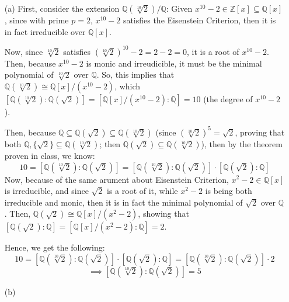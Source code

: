 \documentclass{article}
\begin{document}
\begin{itemize}
    \item[(a)] First, consider the extension $\mathbb{Q}(\sqrt[10]{2})/\mathbb{Q}$: Given $x^{10}-2\in\mathbb{Z}[x]\subseteq\mathbb{Q}[x]$, since with prime $p=2$, $x^{10}-2$ satisfies the Eisenstein Criterion,
    then it is in fact irreducible over $\mathbb{Q}[x]$.

    Now, since $\sqrt[10]{2}$ satisfies $(\sqrt[10]{2})^{10}-2=2-2=0$, it is a root of $x^{10}-2$.
    Then, because $x^{10}-2$ is monic and irreudicible, it must be the minimal polynomial of $\sqrt[10]{2}$ over $\mathbb{Q}$.
    So, this implies that $\mathbb{Q}(\sqrt[10]{2})\cong \mathbb{Q}[x]/(x^{10}-2)$, which $[\mathbb{Q}(\sqrt[10]{2}):\mathbb{Q}(\sqrt{2})]=[\mathbb{Q}[x]/(x^{10}-2):\mathbb{Q}]=10$ (the degree of $x^{10}-2$).

    Then, because $\mathbb{Q}\subseteq \mathbb{Q}(\sqrt{2})\subseteq \mathbb{Q}(\sqrt[10]{2})$ (since $(\sqrt[10]{2})^5 = \sqrt{2}$, proving that both $\mathbb{Q},\{\sqrt{2}\}\subseteq \mathbb{Q}(\sqrt[10]{2})$;
    then $\mathbb{Q}(\sqrt{2})\subseteq \mathbb{Q}(\sqrt[10]{2})$), then by the theorem proven in class, we know:
    $$10=[\mathbb{Q}(\sqrt[10]{2}):\mathbb{Q}(\sqrt{2})]=[\mathbb{Q}(\sqrt[10]{2}):\mathbb{Q}(\sqrt{2})]\cdot [\mathbb{Q}(\sqrt{2}):\mathbb{Q}]$$
    Now, because of the same arument about Eisenstein Criterion, $x^2-2\in\mathbb{Q}[x]$ is irreducible, and since $\sqrt{2}$ is a root of it, while $x^2-2$ is being both irreducible and monic,
    then it is in fact the minimal polynomial of $\sqrt{2}$ over $\mathbb{Q}$. Then, $\mathbb{Q}(\sqrt{2})\cong\mathbb{Q}[x]/(x^2-2)$, showing that $[\mathbb{Q}(\sqrt{2}):\mathbb{Q}]=[\mathbb{Q}[x]/(x^2-2):\mathbb{Q}]=2$.

    Hence, we get the following:
    $$10=[\mathbb{Q}(\sqrt[10]{2}):\mathbb{Q}(\sqrt{2})]\cdot [\mathbb{Q}(\sqrt{2}):\mathbb{Q}]=[\mathbb{Q}(\sqrt[10]{2}):\mathbb{Q}(\sqrt{2})]\cdot 2$$
    $$\implies [\mathbb{Q}(\sqrt[10]{2}):\mathbb{Q}(\sqrt{2})]=5$$
    \item[(b)] 
\end{itemize}
\end{document}
